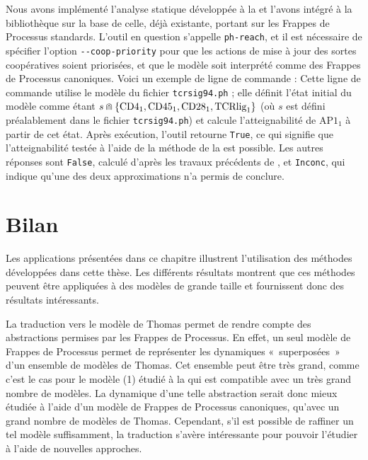 Nous avons implémenté l'analyse statique développée à la 
et l'avons intégré à la bibliothèque \Pint
sur la base de celle, déjà existante, portant sur les Frappes de Processus standards.
L'outil en question s'appelle \texttt{ph-reach}, et il est nécessaire de spécifier l'option
\texttt{-{}-coop-priority}
pour que les actions de mise à jour des sortes coopératives soient priorisées,
et que le modèle soit interprété comme des Frappes de Processus canoniques.
Voici un exemple de ligne de commande :
Cette ligne de commande utilise le modèle du fichier \texttt{tcrsig94.ph} ;
elle définit l'état initial du modèle comme étant
$s \Cap \{ \text{CD4}_1, \text{CD45}_1, \text{CD28}_1, \text{TCRlig}_1 \}$
(où $s$ est défini préalablement dans le fichier \texttt{tcrsig94.ph})
et calcule l'atteignabilité de $\text{AP1}_1$ à partir de cet état.
Après exécution, l'outil retourne \texttt{True}, ce qui signifie que l'atteignabilité
testée à l'aide de la méthode de la  est possible.
Les autres réponses sont \texttt{False},
calculé d'après les travaux précédents de ,
et \texttt{Inconc}, qui indique qu'une des deux approximations n'a permis de conclure.



\section{Bilan}

Les applications présentées dans ce chapitre illustrent l'utilisation des méthodes
développées dans cette thèse.
Les différents résultats montrent que ces méthodes peuvent être appliquées à des modèles
de grande taille et fournissent donc des résultats intéressants.

\myskip

La traduction vers le modèle de Thomas permet de rendre compte des abstractions
permises par les Frappes de Processus.
En effet, un seul modèle de Frappes de Processus permet de représenter les dynamiques
«~superposées~» d'un ensemble de modèles de Thomas.
Cet ensemble peut être très grand, comme c'est le cas pour le modèle (1) étudié à la
 qui est compatible avec un très grand nombre de modèles.
La dynamique d'une telle abstraction serait donc mieux étudiée à l'aide d'un modèle
de Frappes de Processus canoniques, qu'avec un grand nombre de modèles de Thomas.
Cependant, s'il est possible de raffiner un tel modèle suffisamment, la traduction
s'avère intéressante pour pouvoir l'étudier à l'aide de nouvelles approches.

